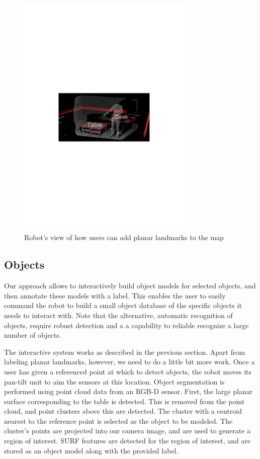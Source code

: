 \documentclass[12pt]{gatech-thesis}
\begin{document}
\begin{figure}[ht!]
\centering
\includegraphics[width=0.75\textwidth]{pics/pointing_table_desk}
\caption{Robot's view of how users can add planar landmarks to the map}
\label{fig:pointing_table_desk}
\end{figure}

\subsection{Objects}
\label{sec:map_objects}

Our approach allows to interactively build object models for selected objects, and then annotate these models with a label. This enables the user to easily command the robot to build a small object database of the specific objects it needs to interact with. Note that the alternative, automatic recognition of objects, require robust detection and a a capability to reliable recognize a large number of objects.

The interactive system works as described in the previous section. Apart from labeling planar landmarks, however, we need to do a little bit more work. Once a user has given a referenced point at which to detect
objects, the robot moves its pan-tilt unit to aim the sensors
at this location. Object segmentation is performed using
point cloud data from an RGB-D sensor. First, the large
planar surface corresponding to the table is detected. This
is removed from the point cloud, and point clusters above
this are detected. The cluster with a centroid nearest to the
reference point is selected as the object to be modeled. The
cluster’s points are projected into our camera image, and
are used to generate a region of interest. SURF features are
detected for the region of interest, and are stored as an object
model along with the provided label.
\end{document}
